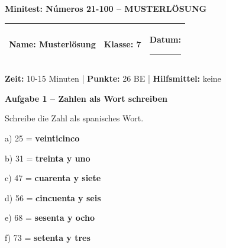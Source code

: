 \documentclass[11pt, a4paper]{article}
\newcommand{\fachfarbe}{spanisch}
\newcommand{\thema}{Minitest: Números 21-100 -- MUSTERLÖSUNG}
\newcommand{\klasse}{7}
\newcommand{\maxpunkte}{26}
\newcommand{\zeit}{10-15 Minuten}
\newcommand{\punktebox}[1]{\hfill\fbox{\small \_/#1}}
\newcommand{\luecke}[1]{\rule{#1}{0.4pt}}
\newcommand{\lsg}[1]{\textcolor{loesung}{\textbf{#1}}}
\newenvironment{aufgabe}[1]{%
    \needspace{5\baselineskip}%
    \nopagebreak[4]%
    \vspace{10pt}
    \noindent\textbf{\textcolor{\fachfarbe}{Aufgabe #1}}
    \nopagebreak[4]%
    \vspace{5pt}
    \nopagebreak[4]%
    \begin{list}{}{\leftmargin=0pt}
    \item[]
}{%
    \end{list}
}
\begin{document}

\begin{center}
    {\Large\bfseries\textcolor{loesung}{\thema}}
\end{center}

\vspace{5pt}

\noindent
\begin{tabularx}{\textwidth}{|X|X|X|}
\hline
\textbf{Name:} \lsg{Musterlösung} &
\textbf{Klasse:} \klasse &
\textbf{Datum:} \luecke{2cm} \\
\hline
\end{tabularx}

\vspace{10pt}

\begin{infobox}
\textbf{Zeit:} \zeit{} | \textbf{Punkte:} \maxpunkte{} BE | \textbf{Hilfsmittel:} keine
\end{infobox}

\vspace{15pt}


\begin{aufgabe}{1 -- Zahlen als Wort schreiben}
Schreibe die Zahl als spanisches Wort. \punktebox{8}
\end{aufgabe}

\noindent
a) 25 = \lsg{veinticinco}

\vspace{0.8em}

\noindent
b) 31 = \lsg{treinta y uno}

\vspace{0.8em}

\noindent
c) 47 = \lsg{cuarenta y siete}

\vspace{0.8em}

\noindent
d) 56 = \lsg{cincuenta y seis}

\vspace{0.8em}

\noindent
e) 68 = \lsg{sesenta y ocho}

\vspace{0.8em}

\noindent
f) 73 = \lsg{setenta y tres}
\end{document}
